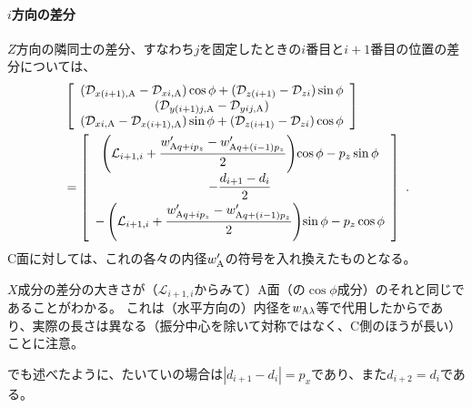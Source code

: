 \paragraph{$i$方向の差分}\noindent
$Z$方向の隣同士の差分、すなわち$j$を固定したときの$i$番目と$i+1$番目の位置の差分については、
\begin{align*}
 &\left[
  \begin{array}{c}
    (\mathcal D_{x(i+1),\text A}-\mathcal D_{xi,\text A})\cos\phi
    +(\mathcal D_{z(i+1)}-\mathcal D_{zi})\sin\phi\\
    (\mathcal D_{y(i+1)j,\text A}-\mathcal D_{yij,\text A})\\
    (\mathcal D_{xi,\text A}-\mathcal D_{x(i+1),\text A})\sin\phi+(\mathcal D_{z(i+1)}-\mathcal D_{zi})\cos\phi
  \end{array}
  \right]\\
 &= \left[
    \begin{array}{c}
      \displaystyle
      \left(\mathcal L_{i+1, i}+\frac{w'_{\text Aq+ip_z}-w'_{\text Aq+(i-1)p_z}}2\right)\!\cos\phi-p_z\sin\phi\\[6pt]
      \displaystyle-\frac{d_{i+1}-d_i}2\\[6pt]
      \displaystyle
      -\left(\mathcal L_{i+1, i}+\frac{w'_{\text Aq+ip_z}-w'_{\text Aq+(i-1)p_z}}2\right)\!\sin\phi-p_z\cos\phi
    \end{array}
    \right]\ .
\end{align*}
C面に対しては、これの各々の内径$w_\text A'$の符号を入れ換えたものとなる。
\begin{hosokubox}
$X$成分の差分の大きさが（$\mathcal L_{i+1, i}$からみて）A面（の$\cos\phi$成分）のそれと同じであることがわかる。
これは（水平方向の）内径を$w_{\text A\lambda}$等で代用したからであり、実際の長さは異なる（振分中心を除いて対称ではなく、C側のほうが長い）ことに注意。
\end{hosokubox}
\begin{hosokubox}[label=hosoku:generallyDimpleN]
でも述べたように、たいていの場合は$|d_{i+1}-d_i|=p_x$であり、また$d_{i+2} = d_i$である。
\end{hosokubox}




